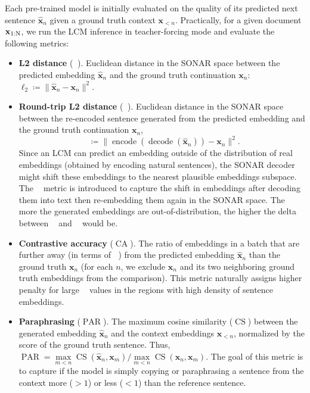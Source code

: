 \documentclass[twoside,11pt]{fairmeta}
\newcommand{\sonar}{\textsc{SONAR}\xspace}
\newcommand{\diffx}[2]{\rvx^{#1}_{#2}}
\DeclareMathOperator{\encode}{encode}
\DeclareMathOperator{\decode}{decode}
\newcommand{\defeq}{\coloneqq}
\DeclareMathOperator{\ltwo}{\ell_2}
\DeclareMathOperator{\ltworound}{\ell_{2-\text{r}}}
\DeclareMathOperator{\paraphrasing}{PAR}
\DeclareMathOperator{\mseacc}{CA}
\DeclareMathOperator{\cossim}{CS}
\def\rN{{\textnormal{N}}}
\def\rvx{{\mathbf{x}}}
\begin{document}
Each pre-trained model is initially evaluated on the quality of its predicted next sentence $\hat\rvx_n$ given a ground truth context $\diffx{}{<n}$. Practically, for a given document $\rvx_{1:\rN}$, we run the LCM inference in teacher-forcing mode and evaluate the following metrics:
\begin{itemize}[style=unboxed,leftmargin=*]

\item \textbf{L2 distance} ($\ltwo$). Euclidean distance in the \sonar space between the predicted embedding $\hat \rvx_n$ and the ground truth continuation $\rvx_n$: $\ell_2 \defeq \|\hat \rvx_n - \rvx_n\|^2$.

\item \textbf{Round-trip L2 distance} ($\ltworound$). Euclidean distance in the \sonar space between the re-encoded sentence generated from the predicted embedding and the ground truth continuation $\rvx_n$, \[\ltworound \defeq \|\encode(\decode(\hat \rvx_n)) - \rvx_n\|^2.\]
Since an LCM can predict an embedding outside of the distribution of real embeddings (obtained by encoding natural sentences), the \sonar decoder might shift these embeddings to the nearest plausible embeddings subspace. The $\ltworound$ metric is introduced to capture the shift in embeddings after decoding them into text then re-embedding them again in the \sonar space. The more the generated embeddings are out-of-distribution, the higher the delta between $\ltworound$ and $\ltwo$ would be.

\item \textbf{Contrastive accuracy} ($\mseacc$). The ratio of embeddings in a batch that are further away (in terms of $\ltwo$) from the predicted embedding $\hat \rvx_n$ than the ground truth $\rvx_n$ (for each $n$, we exclude $\rvx_n$ and its two neighboring ground truth embeddings from the comparison). This metric naturally assigns higher penalty for large $\ltwo$ values in the regions with high density of sentence embeddings. 

\item \textbf{Paraphrasing} ($\paraphrasing$). The maximum cosine similarity ($\cossim$) between the generated embedding $\hat \rvx_n$ and the context embeddings $\rvx_{<n}$,
normalized by the score of the ground truth sentence. 
Thus, $\paraphrasing = \max\limits_{m<n} \cossim(\hat \rvx_n, \rvx_{m}) / \max\limits_{m<n} \cossim(\rvx_n, \rvx_{m})$.
The goal of this metric is to capture if the model is simply copying or paraphrasing a sentence from the context more ($>1$) or less ($<1$) than the reference sentence.


\end{itemize}
\end{document}
